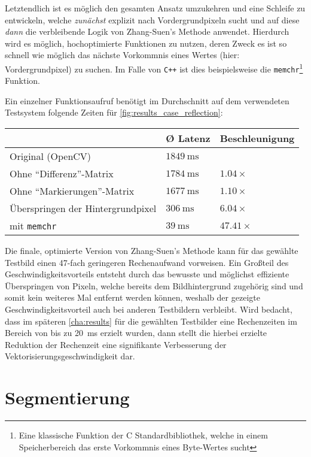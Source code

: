 Letztendlich ist es möglich den gesamten Ansatz umzukehren und eine Schleife zu entwickeln, welche \textit{zunächst} explizit nach Vordergrundpixeln sucht und auf diese \textit{dann} die verbleibende Logik von Zhang-Suen's Methode anwendet.
Hierdurch wird es möglich, hochoptimierte Funktionen zu nutzen, deren Zweck es ist so schnell wie möglich das nächste Vorkommnis eines Wertes (hier: Vordergrundpixel) zu suchen.
Im Falle von \texttt{C++} ist dies beispielsweise die \texttt{memchr}\footnote{Eine klassische Funktion der C Standardbibliothek, welche in einem Speicherbereich das erste Vorkommnis eines Byte-Wertes sucht} Funktion.

Ein einzelner Funktionsaufruf benötigt im Durchschnitt auf dem verwendeten Testsystem folgende Zeiten für \autoref{fig:results_case_reflection}\systemfootnote{}:

\begin{tabu}{l|l|l}
    & Ø Latenz & Beschleunigung \\
    \midrule
    Original (OpenCV) & \(\SI{1849}{\milli\second}\) & \\
    Ohne \enquote{Differenz}-Matrix & \(\SI{1784}{\milli\second}\) & \(\num{1.04}\times\) \\ %
    \ditto{} Ohne \enquote{Markierungen}-Matrix & \(\SI{1677}{\milli\second}\) & \(\num{1.10}\times\) \\ %
    \ditto{} Überspringen der Hintergrundpixel & \(\SI{306}{\milli\second}\) & \(\num{6.04}\times\) \\ %
    \ditto{} mit \texttt{memchr} & \(\SI{39}{\milli\second}\) & \(\num{47.41}\times\) %
\end{tabu}

Die finale, optimierte Version von Zhang-Suen's Methode kann für das gewählte Testbild einen \num{47}-fach geringeren Rechenaufwand vorweisen.
Ein Großteil des Geschwindigkeitsvorteils entsteht durch das bewusste und möglichst effiziente Überspringen von Pixeln, welche bereits dem Bildhintergrund zugehörig sind und somit kein weiteres Mal entfernt werden können, weshalb der gezeigte Geschwindigkeitsvorteil auch bei anderen Testbildern verbleibt.
Wird bedacht, dass im späteren \autoref{cha:results} für die gewählten Testbilder eine Rechenzeiten im Bereich von bis zu \SI{20}{\milli\second} erzielt wurden, dann stellt die hierbei erzielte Reduktion der Rechenzeit eine signifikante Verbesserung der Vektorisierungsgeschwindigkeit dar.

\clearpage
\section{Segmentierung}%
\label{sec:implementation_segmentation}

